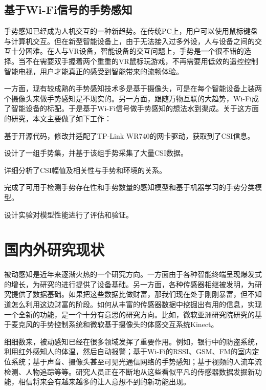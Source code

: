 \subsection{基于Wi-Fi信号的手势感知}
手势感知已经成为人机交互的一种新趋势。在传统PC上，用户可以使用鼠标键盘与计算机交互。但在新型智能设备上，由于无法接入过多外设，人与设备之间的交互十分困难。在人与VR设备，智能设备的交互问题上，手势是一个很不错的选择。当不在需要双手握着两个重重的VR鼠标玩游戏，不再需要用低效的遥控控制智能电视，用户才能真正的感受到智能带来的流畅体验。

一方面，现有较成熟的手势感知技术多是基于摄像头，可是在每个智能设备上装两个摄像头来做手势感知是不现实的。另一方面，跟随万物互联的大趋势，Wi-Fi成了智能设备的标配。于是基于Wi-Fi信号做手势感知的想法水到渠成。关于这方面的研究，本文主要做了如下工作：
\begin{compactenum}
\item 基于开源代码，修改并适配了TP-Link WR740的网卡驱动，获取到了CSI信息。
\item 设计了一组手势集，并基于该组手势采集了大量CSI数据。
\item 详细分析了CSI幅值及相关性与手势和环境的关系。
\item 完成了可用于检测手势存在性和手势数量的感知模型和基于机器学习的手势分类模型。
\item 设计实验对模型性能进行了评估和验证。
\end{compactenum}

\section{国内外研究现状}


被动感知是近年来逐渐火热的一个研究方向。一方面由于各种智能终端呈现爆发式的增长，为研究的进行提供了设备基础。另一方面，各种传感器相继被发明，为研究提供了数据基础。如果把这些数据比做财富，那我们现在处于刚刚暴富，但不知道怎么利用这边财富的阶段。如何从丰富的传感器数据中挖掘出有用的信息，实现一个全新的功能，是一个十分有意思的研究方向。比如，微软亚洲研究院研究的基于麦克风的手势控制系统和微软基于摄像头的体感交互系统Kinect。

细细数来，被动感知已经在很多领域发挥了重要作用。例如，银行中的防盗系统，利用红外感知人的体温，然后自动报警；基于Wi-Fi的RSSI、GSM、FM的室内定位系统；基于声音、摄像头甚至可见光通信网络的手势感知；基于视频的人流车流检测、人物追踪等等。研究人员正在不断地从这些看似平凡的传感器数据发掘新功能，相信将来会有越来越多的让人意想不到的新功能出现。 


